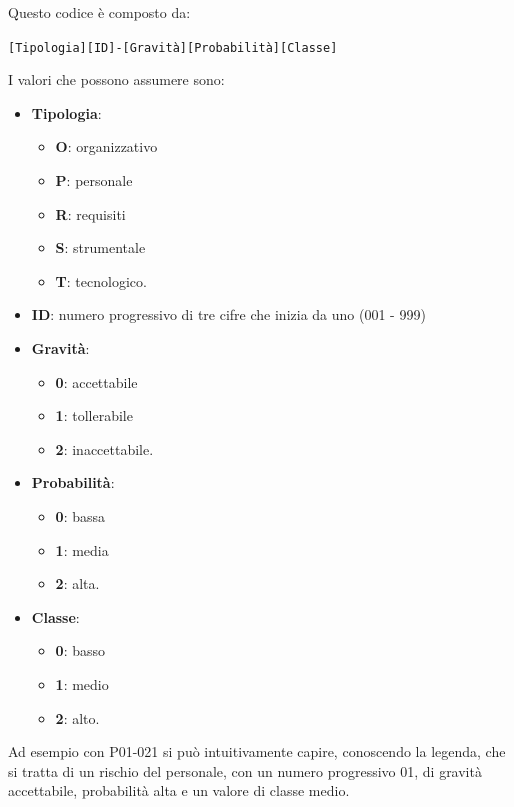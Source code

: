 	Questo codice è composto da:
	
	\begin{center}
		\texttt{[Tipologia][ID]-[Gravità][Probabilità][Classe]}
	\end{center}

	I valori che possono assumere sono:
	
	\begin{itemize}
		\item \textbf{Tipologia}:
			\begin{itemize}
				\item \textbf{O}: organizzativo
				\item \textbf{P}: personale
				\item \textbf{R}: requisiti
				\item \textbf{S}: strumentale
				\item \textbf{T}: tecnologico.
			\end{itemize}
		
		\item \textbf{ID}: numero progressivo di tre cifre che inizia da uno (001 - 999)
		\item \textbf{Gravità}:
			\begin{itemize}
				\item \textbf{0}: accettabile
				\item \textbf{1}: tollerabile
				\item \textbf{2}: inaccettabile.
			\end{itemize}
		
		\item \textbf{Probabilità}:
			\begin{itemize}
				\item \textbf{0}: bassa
				\item \textbf{1}: media
				\item \textbf{2}: alta.
			\end{itemize}
		
		\item \textbf{Classe}:
			\begin{itemize}
				\item \textbf{0}: basso
				\item \textbf{1}: medio
				\item \textbf{2}: alto.
			\end{itemize}
	\end{itemize}

	Ad esempio con P01-021 si può intuitivamente capire, conoscendo la legenda, che si tratta di un rischio del personale, con un numero progressivo 01, di gravità accettabile, probabilità alta e un valore di classe medio.
	
